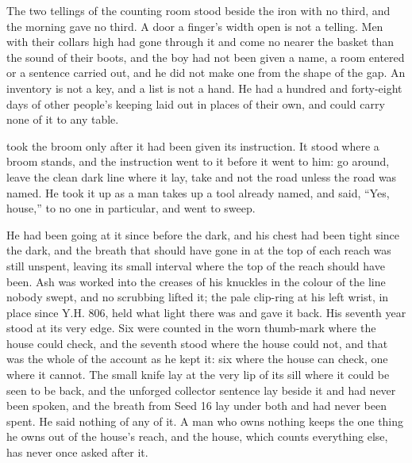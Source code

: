 The two tellings of the counting room stood beside the iron with no third, and the morning gave no third. A door a finger's width open is not a telling. Men with their collars high had gone through it and come no nearer the basket than the sound of their boots, and the boy had not been given a name, a room entered or a sentence carried out, and he did not make one from the shape of the gap. An inventory is not a key, and a list is not a hand. He had a hundred and forty-eight days of other people's keeping laid out in places of their own, and could carry none of it to any table.

\scenebreak

 took the broom only after it had been given its instruction. It stood where a broom stands, and the instruction went to it before it went to him: go around, leave the clean dark line where it lay, take  and not the road unless the road was named. He took it up as a man takes up a tool already named, and said, “Yes, house,” to no one in particular, and went to sweep.

He had been going at it since before the dark, and his chest had been tight since the dark, and the breath that should have gone in at the top of each reach was still unspent, leaving its small interval where the top of the reach should have been. Ash was worked into the creases of his knuckles in the colour of the line nobody swept, and no scrubbing lifted it; the pale clip-ring at his left wrist, in place since Y.H. 806, held what light there was and gave it back. His seventh year stood at its very edge. Six were counted in the worn thumb-mark where the house could check, and the seventh stood where the house could not, and that was the whole of the account as he kept it: six where the house can check, one where it cannot. The small knife lay at the very lip of its sill where it could be seen to be back, and the unforged collector sentence lay beside it and had never been spoken, and the breath from Seed 16 lay under both and had never been spent. He said nothing of any of it. A man who owns nothing keeps the one thing he owns out of the house's reach, and the house, which counts everything else, has never once asked after it.

